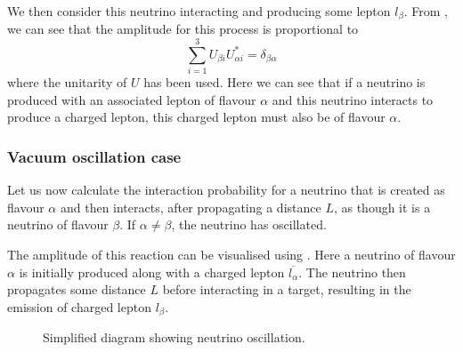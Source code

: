We then consider this neutrino interacting and producing some lepton $l_{\beta}$.
From , we can see that the amplitude for this process is proportional to
\begin{equation}
  \sum_{i=1}^{3} U_{\beta i}U_{\alpha i}^{*} = \delta_{\beta \alpha}
\end{equation}
where the unitarity of $U$ has been used.
Here we can see that if a neutrino is produced with an associated lepton of flavour $\alpha$ and this neutrino interacts to produce a charged lepton, this charged lepton must also be of flavour $\alpha$.

\subsubsection{Vacuum oscillation case}

Let us now calculate the interaction probability for a neutrino that is created as flavour $\alpha$ and then interacts, after propagating a distance $L$, as though it is a neutrino of flavour $\beta$.
If $\alpha \neq \beta$, the neutrino has oscillated.

The amplitude of this reaction can be visualised using .
Here a neutrino of flavour $\alpha$ is initially produced along with a charged lepton $\overline{l_{\alpha}}$.
The neutrino then propagates some distance $L$ before interacting in a target, resulting in the emission of charged lepton $l_{\beta}$.

\begin{figure}[h]
  \centering
  \caption[Simplified diagram showing neutrino oscillation]{Simplified diagram showing neutrino oscillation.}
  \label{fig:oscillationDiag1}
\end{figure}

